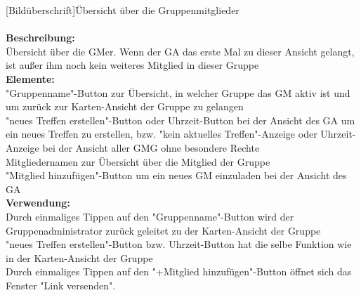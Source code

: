 [Bildüberschrift]Übersicht über die Gruppenmitglieder\\ \\
\textbf{Beschreibung:}\\
Übersicht über die GMer. Wenn der GA das erste Mal zu dieser Ansicht gelangt, ist außer ihm noch kein weiteres Mitglied in dieser Gruppe\\
\textbf{Elemente:}\\
"Gruppenname"-Button zur Übersicht, in welcher Gruppe das GM aktiv ist und um zurück zur Karten-Ansicht der Gruppe zu gelangen\\
"neues Treffen erstellen"-Button oder Uhrzeit-Button bei der Ansicht des GA um ein neues Treffen zu erstellen, bzw. "kein aktuelles Treffen"-Anzeige oder Uhrzeit-Anzeige bei der Ansicht aller GMG ohne besondere Rechte\\
Mitgliedernamen zur Übersicht über die Mitglied der Gruppe\\
"Mitglied hinzufügen"-Button um ein neues GM einzuladen bei der Ansicht des GA\\
\textbf{Verwendung:}\\
Durch einmaliges Tippen auf den "Gruppenname"-Button wird der Gruppenadministrator zurück geleitet zu der Karten-Ansicht der Gruppe\\
"neues Treffen erstellen"-Button bzw. Uhrzeit-Button hat die selbe Funktion wie in der Karten-Ansicht der Gruppe\\
Durch einmaliges Tippen auf den "+Mitglied hinzufügen"-Button öffnet sich das Fenster "Link versenden".
\newpage


